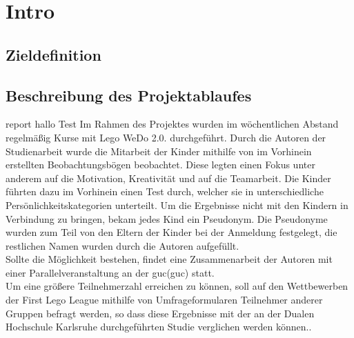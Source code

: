 \chapter{Intro}


\section{Zieldefinition}

\section{Beschreibung des Projektablaufes}
\gls{report} hallo Test
Im Rahmen des Projektes wurden im wöchentlichen Abstand regelmäßig Kurse mit Lego WeDo 2.0. durchgeführt. Durch die Autoren der Studienarbeit wurde die Mitarbeit der Kinder mithilfe von im Vorhinein erstellten Beobachtungsbögen beobachtet. Diese legten einen Fokus unter anderem auf die Motivation, Kreativität und auf die Teamarbeit. Die Kinder führten dazu im Vorhinein einen Test durch, welcher sie in unterschiedliche Persönlichkeitskategorien unterteilt. Um die Ergebnisse nicht mit den Kindern in Verbindung zu bringen, bekam jedes Kind ein Pseudonym. Die Pseudonyme wurden zum Teil von den Eltern der Kinder bei der Anmeldung festgelegt, die restlichen Namen wurden durch die Autoren aufgefüllt.\\
Sollte die Möglichkeit bestehen, findet eine Zusammenarbeit der Autoren mit einer Parallelveranstaltung an der \acrlong{guc}(\acrshort{guc}) statt.\\
Um eine größere Teilnehmerzahl erreichen zu können, soll auf den Wettbewerben der First Lego League mithilfe von Umfrageformularen Teilnehmer anderer Gruppen befragt werden, so dass diese Ergebnisse mit der an der Dualen Hochschule Karlsruhe durchgeführten Studie verglichen werden können..
